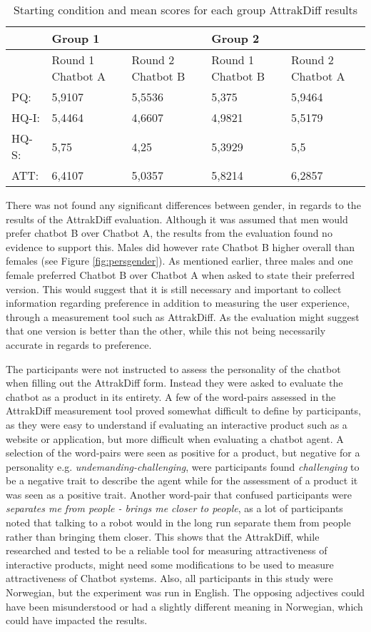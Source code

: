 \begin{table}[H]
\centering
\begin{tabular}{lll|ll}
\hline
& Group 1 &  & Group 2 &  \\
\hline
& Round 1 Chatbot A & Round 2 Chatbot B & Round 1 Chatbot B & Round 2 Chatbot A \\
\hline
PQ: & 5,9107 & 5,5536 & 5,375 & 5,9464 \\
HQ-I: & 5,4464 & 4,6607 & 4,9821 & 5,5179 \\
HQ-S: & 5,75 & 4,25 & 5,3929 & 5,5 \\
ATT: & 6,4107 & 5,0357 & 5,8214 & 6,2857 \\
\end{tabular}
\caption{Starting condition and mean scores for each group AttrakDiff results}
    \label{tab:startconmean}
\end{table}

There was not found any significant differences between gender, in regards to the results of the AttrakDiff evaluation. Although it was assumed that men would prefer chatbot B over Chatbot A, the results from the evaluation found no evidence to support this. Males did however rate Chatbot B higher overall than females (see Figure \ref{fig:persgender}). As mentioned earlier, three males and one female preferred Chatbot B over Chatbot A when asked to state their preferred version. This would suggest that it is still necessary and important to collect information regarding preference in addition to measuring the user experience, through a measurement tool such as AttrakDiff. As the evaluation might suggest that one version is better than the other, while this not being necessarily accurate in regards to preference.

The participants were not instructed to assess the personality of the chatbot when filling out the AttrakDiff form. Instead they were asked to evaluate the chatbot as a product in its entirety. A few of the word-pairs assessed in the AttrakDiff measurement tool proved somewhat difficult to define by participants, as they were easy to understand if evaluating an interactive product such as a website or application, but more difficult when evaluating a chatbot agent. A selection of the word-pairs were seen as positive for a product, but negative for a personality e.g. \textit{undemanding-challenging}, were participants found \textit{challenging} to be a negative trait to describe the agent while for the assessment of a product it was seen as a positive trait. Another word-pair that confused participants were \textit{separates me from people - brings me closer to people}, as a lot of participants noted that talking to a robot would in the long run separate them from people rather than bringing them closer. This shows that the AttrakDiff, while researched and tested to be a reliable tool for measuring attractiveness of interactive products, might need some modifications to be used to measure attractiveness of Chatbot systems. Also, all participants in this study were Norwegian, but the experiment was run in English. The opposing adjectives could have been misunderstood or had a slightly different meaning in Norwegian, which could have impacted the results.

